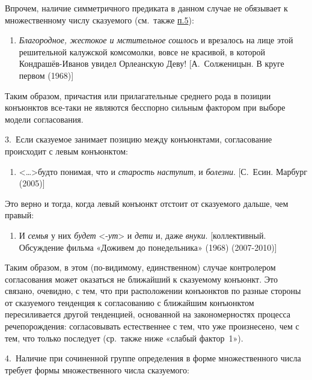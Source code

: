 Впрочем, наличие симметричного предиката в данном случае не обязывает к
множественному числу сказуемого (см.~также \underline{п.5}):

\begin{enumerate}
  \def\labelenumi{(\arabic{enumi})}
  \setcounter{enumi}{92}
  \item
        \textit{Благородное, жестокое и мстительное} \textit{сошлось} и врезалось
        на лице этой решительной калужской комсомолки, вовсе не красивой, в
        которой Кондрашёв-Иванов увидел Орлеанскую Деву! {[}А.~Солженицын. В
        круге первом (1968){]}
\end{enumerate}

Таким образом, причастия или прилагательные среднего рода в позиции
конъюнктов все-таки не являются бесспорно сильным фактором при выборе
модели согласования.

3.~Если сказуемое занимает позицию между конъюнктами, согласование
происходит с левым конъюнктом:

\begin{enumerate}
  \def\labelenumi{(\arabic{enumi})}
  \setcounter{enumi}{93}
  \item
        \textless\ldots\textgreater будто понимая, что и \textit{старость}
        \textit{наступит}, и \textit{болезни}. {[}С.~Есин. Марбург (2005){]}
\end{enumerate}

Это верно и тогда, когда левый конъюнкт отстоит от сказуемого дальше,
чем правый:

\begin{enumerate}
  \def\labelenumi{(\arabic{enumi})}
  \setcounter{enumi}{94}
  \item
        И \textit{семья} у них \textit{будет} \textless*-\textit{ут}\textgreater{} и
        \textit{дети} и, даже \textit{внуки}. {[}коллективный. Обсуждение фильма
        «Доживем до понедельника» (1968) (2007-2010){]}
\end{enumerate}

Таким образом, в этом (по-видимому, единственном) случае контролером
согласования может оказаться не ближайший к сказуемому конъюнкт. Это
связано, очевидно, с тем, что при расположении конъюнктов по разные
стороны от сказуемого тенденция к согласованию с ближайшим конъюнктом
пересиливается другой тенденцией, основанной на закономерностях процесса
речепорождения: согласовывать естественнее с тем, что уже произнесено,
чем с тем, что только последует (ср.~также ниже «слабый фактор~1»).

4.~Наличие при сочиненной группе определения в форме множественного
числа требует формы множественного числа сказуемого:

